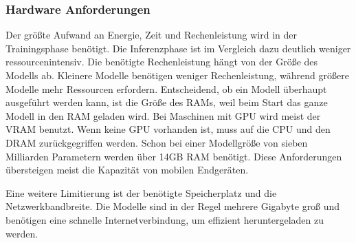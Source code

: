 \subsubsection{Hardware Anforderungen} \label{sec:llm_hw_requirements}

Der größte Aufwand an Energie, Zeit und Rechenleistung wird in der Trainingsphase benötigt. Die Inferenzphase ist im Vergleich dazu deutlich weniger ressourcenintensiv. Die benötigte Rechenleistung hängt von der Größe des Modells ab. Kleinere Modelle benötigen weniger Rechenleistung, während größere Modelle mehr Ressourcen erfordern. Entscheidend, ob ein Modell überhaupt ausgeführt werden kann, ist die Größe des RAMs, weil beim Start das ganze Modell in den RAM geladen wird. Bei Maschinen mit GPU wird meist der VRAM benutzt. Wenn keine GPU vorhanden ist, muss auf die CPU und den DRAM zurückgegriffen werden. Schon bei einer Modellgröße von sieben Milliarden Parametern werden über 14GB RAM benötigt. Diese Anforderungen übersteigen meist die Kapazität von mobilen Endgeräten. \cite{llm-memory}

Eine weitere Limitierung ist der benötigte Speicherplatz und die Netzwerkbandbreite. Die Modelle sind in der Regel mehrere Gigabyte groß und benötigen eine schnelle Internetverbindung, um effizient heruntergeladen zu werden. \cite{llm-webllm}
